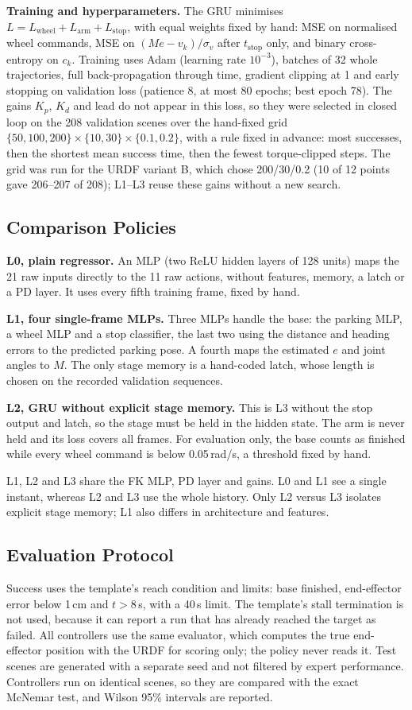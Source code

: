 \documentclass[conference]{IEEEtran}
\begin{document}
\textbf{Training and hyperparameters.} The GRU minimises $L=L_\text{wheel}+L_\text{arm}+L_\text{stop}$, with equal
weights fixed by hand: MSE on normalised wheel commands, MSE on $(Me-v_k)/\sigma_v$ after $t_\text{stop}$ only, and
binary cross-entropy on $c_k$. Training uses Adam (learning rate $10^{-3}$), batches of 32 whole trajectories, full
back-propagation through time, gradient clipping at 1 and early stopping on validation loss (patience 8, at most 80
epochs; best epoch 78). The gains $K_p$, $K_d$ and lead do not appear in this loss, so they were selected in closed
loop on the 208 validation scenes over the hand-fixed grid $\{50,100,200\}\times\{10,30\}\times\{0.1,0.2\}$, with a
rule fixed in advance: most successes, then the shortest mean success time, then the fewest torque-clipped steps.
The grid was run for the URDF variant B, which chose 200/30/0.2 (10 of 12 points gave 206--207 of 208); L1--L3
reuse these gains without a new search.

\subsection{Comparison Policies}
\textbf{L0, plain regressor.} An MLP (two ReLU hidden layers of 128 units) maps the 21 raw inputs directly to the 11
raw actions, without features, memory, a latch or a PD layer. It uses every fifth training frame, fixed by hand.

\textbf{L1, four single-frame MLPs.} Three MLPs handle the base: the parking MLP, a wheel MLP and a stop classifier,
the last two using the distance and heading errors to the predicted parking pose. A fourth maps the estimated $e$
and joint angles to $M$. The only stage memory is a hand-coded latch, whose length is chosen on the recorded
validation sequences.

\textbf{L2, GRU without explicit stage memory.} This is L3 without the stop output and latch, so the stage must be
held in the hidden state. The arm is never held and its loss covers all frames. For evaluation only, the base counts
as finished while every wheel command is below 0.05\,rad/s, a threshold fixed by hand.

L1, L2 and L3 share the FK MLP, PD layer and gains. L0 and L1 see a single instant, whereas L2 and L3 use the whole
history. Only L2 versus L3 isolates explicit stage memory; L1 also differs in architecture and features.

\subsection{Evaluation Protocol}
Success uses the template's reach condition and limits: base finished, end-effector error below 1\,cm and $t>8$\,s,
with a 40\,s limit. The template's stall termination is not used, because it can report a run that has already
reached the target as failed. All controllers use the same evaluator, which computes the true end-effector position
with the URDF for scoring only; the policy never reads it. Test scenes are generated with a separate seed and not
filtered by expert performance. Controllers run on identical scenes, so they are compared with the exact McNemar
test, and Wilson 95\% intervals are reported.
\end{document}
